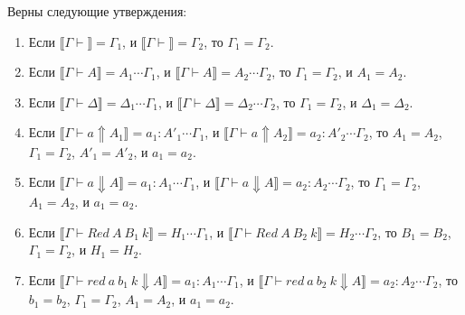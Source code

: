 \documentclass{amsart}
\theoremstyle{definition}
\theoremstyle{remark}
\renewcommand{\ll}{\llbracket}
\newcommand{\rr}{\rrbracket}
\numberwithin{figure}{section}
\begin{document}
\begin{lem}
Верны следующие утверждения:
\begin{enumerate}
\item Если $\ll \Gamma \vdash \rr = \Gamma_1$, и $\ll \Gamma \vdash \rr = \Gamma_2$, то $\Gamma_1 = \Gamma_2$.
\item Если $\ll \Gamma \vdash A \rr = A_1 \dotsb \Gamma_1$, и $\ll \Gamma \vdash A \rr = A_2 \dotsb \Gamma_2$, то $\Gamma_1 = \Gamma_2$, и $A_1 = A_2$.
\item Если $\ll \Gamma \vdash \Delta \rr = \Delta_1 \dotsb \Gamma_1$, и $\ll \Gamma \vdash \Delta \rr = \Delta_2 \dotsb \Gamma_2$, то $\Gamma_1 = \Gamma_2$, и $\Delta_1 = \Delta_2$.
\item Если $\ll \Gamma \vdash a \Uparrow A_1 \rr = a_1 : A'_1 \dotsb \Gamma_1$, и $\ll \Gamma \vdash a \Uparrow A_2 \rr = a_2 : A'_2 \dotsb \Gamma_2$, то $A_1 = A_2$, $\Gamma_1 = \Gamma_2$, $A'_1 = A'_2$, и $a_1 = a_2$.
\item Если $\ll \Gamma \vdash a \Downarrow A \rr = a_1 : A_1 \dotsb \Gamma_1$, и $\ll \Gamma \vdash a \Downarrow A \rr = a_2 : A_2 \dotsb \Gamma_2$, то $\Gamma_1 = \Gamma_2$, $A_1 = A_2$, и $a_1 = a_2$.
\item Если $\ll \Gamma \vdash Red\ A\ B_1\ k \rr = H_1 \dotsb \Gamma_1$, и $\ll \Gamma \vdash Red\ A\ B_2\ k \rr = H_2 \dotsb \Gamma_2$, то $B_1 = B_2$, $\Gamma_1 = \Gamma_2$, и $H_1 = H_2$.
\item Если $\ll \Gamma \vdash red\ a\ b_1\ k \Downarrow A \rr = a_1 : A_1 \dotsb \Gamma_1$, и $\ll \Gamma \vdash red\ a\ b_2\ k \Downarrow A \rr = a_2 : A_2 \dotsb \Gamma_2$, то $b_1 = b_2$, $\Gamma_1 = \Gamma_2$, $A_1 = A_2$, и $a_1 = a_2$.
\end{enumerate}
\end{lem}
\end{document}
